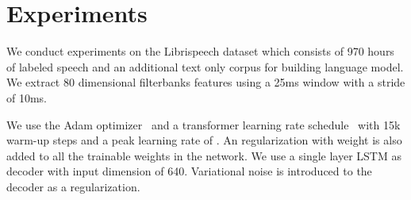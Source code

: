 \documentclass[a4paper]{article}
\newcommand{\netname}{ContextNet}
\begin{document}
\begin{table}[!tb]
    \centering
    \caption{Configuration of the \netname{} encoder.  controls the number of output channels, and thus the scaling of our model. The kernel size is for the window size in the temporal domain; the convolutions are across frequency. If the stride of a convolution block is 2, its last conv layer has a stride of two while the rest of the conv layers has a stride of one, as discussed in Section~\ref{sec:model:encoder}.}
    \label{tab:network_configuration}
\end{table}
 \vspace{-0.05in}
\section{Experiments}  
\vspace{-0.02in}
\label{sec:exp}

We conduct experiments on the Librispeech \cite{panayotov2015librispeech} dataset which consists of 970 hours of labeled speech and an additional text only corpus for building language model. We extract 80 dimensional filterbanks features using a 25ms window with a stride of 10ms.

We use the Adam optimizer~\cite{kingma2014adam} and a transformer learning rate schedule~\cite{vaswani2017attention} with 15k warm-up steps and a peak learning rate of . An  regularization with  weight is also added to all the trainable weights in the network. We use a single layer LSTM as decoder with input dimension of 640.  Variational noise is introduced to the decoder as a regularization. 
\end{document}
